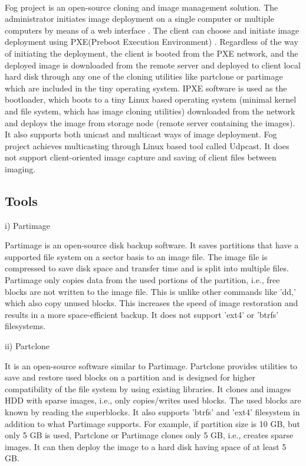 \documentclass[a4paper,12pt]{article}
\begin{document}
\paragraph{}
Fog project \cite{fogproject} is an open-source cloning and image management solution. The administrator initiates image deployment on a single computer or multiple computers by means of a web interface \cite{wiki}. The client can choose and initiate image deployment using PXE(Preboot Execution Environment) \cite{PXE}. Regardless of the way of initiating the deployment, the client is booted from the PXE network, and the deployed image is downloaded from the remote server and deployed to client local hard disk through any one of the cloning utilities like partclone \cite{Partclone} or partimage \cite{Partimage} which are included in the tiny operating system. IPXE \cite{IPXE} software is used as the bootloader, which boots to a tiny Linux based operating system (minimal kernel and file system, which has image cloning utilities) downloaded from the network and deploys the image from storage node (remote server containing the images). It also supports both unicast and multicast ways of image deployment. Fog project achieves multicasting through Linux based tool called Udpcast. It does not support client-oriented image capture and saving of client files between imaging.

\subsection{Tools}


i) Partimage 

Partimage is an open-source disk backup software. It saves partitions that have a supported file system on a sector basis to an image file. The image file is compressed to save disk space and transfer time and is split into multiple files. Partimage only copies data from the used portions of the partition, i.e., free blocks are not written to the image file. This is unlike other commands like 'dd,' which also copy unused blocks. This increases the speed of image restoration and results in a more space-efficient backup. It does not support 'ext4' or 'btrfs' filesystems.

ii) Partclone 

It is an open-source software similar to Partimage. Partclone provides utilities to save and restore used blocks on a partition and is designed for higher compatibility of the file system by using existing libraries. It clones and images HDD with sparse images, i.e., only copies/writes used blocks. The used blocks are known by reading the superblocks. It also supports 'btrfs' and 'ext4' filesystem in addition to what Partimage supports. 
For example, if partition size is 10 GB, but only 5 GB is used, Partclone or Partimage clones only 5 GB, i.e., creates sparse images. It can then deploy the image to a hard disk having space of at least 5 GB.
\end{document}
